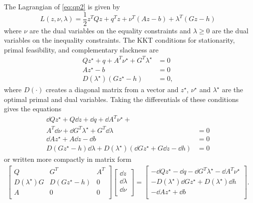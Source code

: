 The Lagrangian of \eqref{eq:qp2} is given by
\begin{equation}
L(z,\nu,\lambda)=\frac{1}{2}z^TQz+q^Tz+\nu^T(Az-b)+\lambda^T(Gz-h)
\end{equation}
where $\nu$ are the dual variables on the equality constraints
and $\lambda\geq 0$ are the dual variables on the inequality constraints.
The KKT conditions for stationarity, primal feasibility,
and complementary slackness are
\begin{equation}
\begin{split}
Qz^\star+q+A^T\nu^\star+G^T\lambda^\star &= 0 \\
Az^\star-b &= 0 \\
D(\lambda^\star)(Gz^\star-h) &= 0,
\end{split}
\end{equation}
where $D(\cdot)$ creates a diagonal matrix from a vector
and $z^\star$, $\nu^\star$ and $\lambda^\star$ are the optimal
primal and dual variables.
Taking the differentials of these conditions gives the equations
\begin{equation}
\begin{split}
\dd Qz^\star + Q \dd z + \dd q + \dd A^T \nu^\star + & \\
A^T \dd \nu + \dd G^T
\lambda^\star + G^T \dd \lambda & = 0 \\
\dd A z^\star + A \dd z - \dd b & = 0 \\
D(Gz^\star -h)\dd \lambda + D(\lambda^\star)(\dd G z^\star  + G \dd z  - \dd h)
& = 0
\end{split}
\end{equation}
or written more compactly in matrix form
\begin{equation}
  \begin{split}
\begin{bmatrix}
Q & G^T & A^T \\
D(\lambda^\star)G  & D(Gz^\star-h) & 0 \\
A & 0 & 0 \\
\end{bmatrix}
\begin{bmatrix}
\dd z \\
\dd \lambda \\
\dd \nu \\
\end{bmatrix} =
\begin{bmatrix}
-\dd Qz^\star - \dd q - \dd G^T\lambda^\star - \dd A^T\nu^\star \\
-D(\lambda^\star)\dd Gz^\star + D(\lambda^\star)\dd h \\
-\dd Az^\star + \dd b \\
\end{bmatrix}.
  \end{split}
  \label{eq:kkt-diff}
\end{equation}
